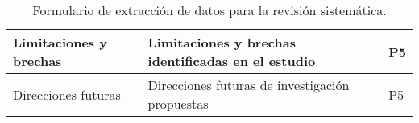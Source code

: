 \begin{frame}
\begin{table}[h!]
{\begin{tabular}{|p{1.8cm}|p{5.5cm}|l|}
                Limitaciones y brechas   & Limitaciones y brechas identificadas en el estudio                    & P5                \\ \hline
                Direcciones futuras      & Direcciones futuras de investigación propuestas                       & P5                \\ \hline
            \end{tabular}
        }
        \caption{Formulario de extracción de datos para la revisión sistemática.}
        \label{tab:formulario-extraccion}
    \end{table}
\end{frame}

